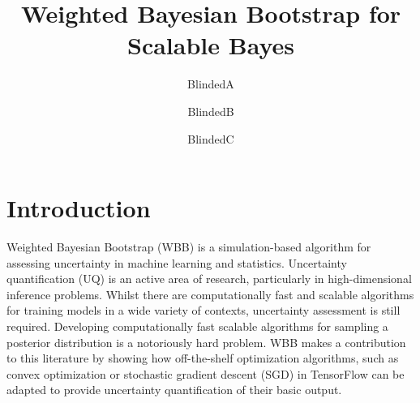 \documentclass[12pt]{TD-CJS}
\begin{document}


\title{Weighted Bayesian Bootstrap for Scalable Bayes}
\author{BlindedA}
\author{BlindedB}
\author{BlindedC}


\makechaptertitle



\newpage

\section{Introduction}
Weighted Bayesian Bootstrap (WBB) is a simulation-based algorithm for assessing uncertainty in machine learning and statistics. Uncertainty quantification (UQ) is an active area of research, particularly in high-dimensional inference problems. Whilst there are computationally fast and scalable algorithms for training models in a wide variety of contexts, uncertainty assessment is still required. Developing computationally fast scalable algorithms for sampling a posterior distribution is a notoriously hard problem. WBB makes a contribution to this literature by showing how off-the-shelf optimization algorithms, such as convex optimization or stochastic gradient descent (SGD) in TensorFlow can be adapted to 
provide uncertainty quantification of their basic output.
 
\end{document}
